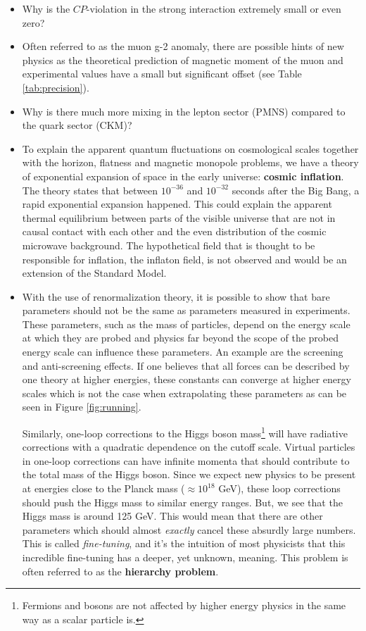\begin{itemize}
\item Why is the $CP$-violation in the strong interaction extremely small or even zero?
\item Often referred to as the muon g-2 anomaly, there are possible hints of new physics as the theoretical prediction of magnetic moment of the muon and experimental values have a small but significant offset (see Table \ref{tab:precision}).
\item Why is there much more mixing in the lepton sector (PMNS) compared to the quark sector (CKM)? 
\item To explain the apparent quantum fluctuations on cosmological scales together with the horizon, flatness and magnetic monopole \cite{McCoy:2015bra} problems, we have a theory of exponential expansion of space in the early universe: \textbf{cosmic inflation}. The theory states that between $10^{-36}$ and $10^{-32}$ seconds after the Big Bang, a rapid exponential expansion happened. This could explain the apparent thermal equilibrium between parts of the visible universe that are not in causal contact with each other and the even distribution of the cosmic microwave background. The hypothetical field that is thought to be responsible for inflation, the inflaton field, is not observed and would be an extension of the Standard Model.
\item With the use of renormalization theory, it is possible to show that bare parameters should not be the same as parameters measured in experiments. These parameters, such as the mass of particles, depend on the energy scale at which they are probed and physics far beyond the scope of the probed energy scale can influence these parameters. An example are the screening and anti-screening effects. If one believes that all forces can be described by one theory at higher energies, these constants can converge at higher energy scales which is not the case when extrapolating these parameters as can be seen in Figure \ref{fig:running}.

Similarly, one-loop corrections to the Higgs boson mass\footnote{Fermions and bosons are not affected by higher energy physics in the same way as a scalar particle is.} will have radiative corrections with a quadratic dependence on the cutoff scale. Virtual particles in one-loop corrections can have infinite momenta that should contribute to the total mass of the Higgs boson. Since we expect new physics to be present at energies close to the Planck mass ($\approx 10^{18}$ GeV), these loop corrections should push the Higgs mass to similar energy ranges. But, we see that the Higgs mass is around 125 GeV. This would mean that there are other parameters which should almost \textit{exactly} cancel these absurdly large numbers. This is called \textit{fine-tuning}, and it's the intuition of most physicists that this incredible fine-tuning has a deeper, yet unknown, meaning. This problem is often referred to as the \textbf{hierarchy problem}.
\end{itemize}




